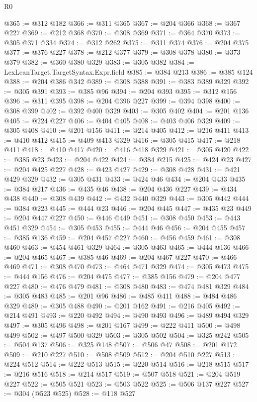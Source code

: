 \begin{lexlean}{R0}
\begin{coremodule}
@365 := @312 @182
@366 := @311 @365
@367 := @204 @366
@368 := @367 @227
@369 := @212 @368
@370 := @308 @369
@371 := @364 @370
@373 := @305 @371 @334
@374 := @312 @262
@375 := @311 @374
@376 := @204 @375
@377 := @376 @227
@378 := @212 @377
@379 := @308 @378
@380 := @373 @379
@382 := @360 @380 @329
@383 := @305 @382
@384 := LexLeanTarget.TargetSyntax.Expr.field
@385 := @384 @213
@386 := @385 @124
@388 := @204 @386 @342
@389 := @308 @388
@391 := @383 @389 @329
@392 := @305 @391
@393 := @385 @96
@394 := @204 @393
@395 := @312 @156
@396 := @311 @395
@398 := @204 @396 @227
@399 := @394 @398
@400 := @308 @399
@402 := @392 @400 @329
@403 := @305 @402
@404 := @201 @136
@405 := @224 @227
@406 := @404 @405
@408 := @403 @406 @329
@409 := @305 @408
@410 := @201 @156
@411 := @214 @405
@412 := @216 @411
@413 := @410 @412
@415 := @409 @413 @329
@416 := @305 @415
@417 := @218 @411
@418 := @410 @417
@420 := @416 @418 @329
@421 := @305 @420
@422 := @385 @23
@423 := @204 @422
@424 := @384 @215
@425 := @424 @23
@427 := @204 @425 @227
@428 := @423 @427
@429 := @308 @428
@431 := @421 @429 @329
@432 := @305 @431
@433 := @424 @46
@434 := @204 @433
@435 := @384 @217
@436 := @435 @46
@438 := @204 @436 @227
@439 := @434 @438
@440 := @308 @439
@442 := @432 @440 @329
@443 := @305 @442
@444 := @384 @223
@445 := @444 @23
@446 := @204 @445
@447 := @435 @23
@449 := @204 @447 @227
@450 := @446 @449
@451 := @308 @450
@453 := @443 @451 @329
@454 := @305 @453
@455 := @444 @46
@456 := @204 @455
@457 := @385 @136
@459 := @204 @457 @227
@460 := @456 @459
@461 := @308 @460
@463 := @454 @461 @329
@464 := @305 @463
@465 := @444 @136
@466 := @204 @465
@467 := @385 @46
@469 := @204 @467 @227
@470 := @466 @469
@471 := @308 @470
@473 := @464 @471 @329
@474 := @305 @473
@475 := @444 @156
@476 := @204 @475
@477 := @385 @156
@479 := @204 @477 @227
@480 := @476 @479
@481 := @308 @480
@483 := @474 @481 @329
@484 := @305 @483
@485 := @201 @96
@486 := @485 @411
@488 := @484 @486 @329
@489 := @305 @488
@490 := @201 @162
@491 := @216 @405
@492 := @214 @491
@493 := @220 @492
@494 := @490 @493
@496 := @489 @494 @329
@497 := @305 @496
@498 := @201 @167
@499 := @222 @411
@500 := @498 @499
@502 := @497 @500 @329
@503 := @305 @502
@504 := @325 @242
@505 := @504 @137
@506 := @325 @148
@507 := @506 @47
@508 := @201 @172
@509 := @210 @227
@510 := @508 @509
@512 := @204 @510 @227
@513 := @224 @512
@514 := @222 @513
@515 := @220 @514
@516 := @218 @515
@517 := @216 @516
@518 := @214 @517
@519 := @507 @518
@521 := @204 @519 @227
@522 := @505 @521
@523 := @503 @522
@525 := @506 @137 @227
@527 := @304 (@523 @525)
@528 := @118 @527

\end{coremodule}
\end{lexlean}
